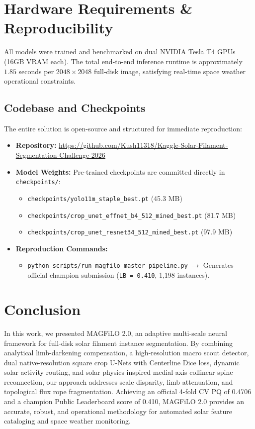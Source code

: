 \documentclass[conference]{IEEEtran}
\begin{document}
\section{Hardware Requirements \& Reproducibility}

All models were trained and benchmarked on dual NVIDIA Tesla T4 GPUs (16GB VRAM each). The total end-to-end inference runtime is approximately $1.85$ seconds per $2048\times2048$ full-disk image, satisfying real-time space weather operational constraints.

\subsection{Codebase and Checkpoints}
The entire solution is open-source and structured for immediate reproduction:
\begin{itemize}
    \item \textbf{Repository:} \url{https://github.com/Kush11318/Kaggle-Solar-Filament-Segmentation-Challenge-2026}
    \item \textbf{Model Weights:} Pre-trained checkpoints are committed directly in \texttt{checkpoints/}:
    \begin{itemize}
        \item \texttt{checkpoints/yolo11m\_staple\_best.pt} (45.3 MB)
        \item \texttt{checkpoints/crop\_unet\_effnet\_b4\_512\_mined\_best.pt} (81.7 MB)
        \item \texttt{checkpoints/crop\_unet\_resnet34\_512\_mined\_best.pt} (97.9 MB)
    \end{itemize}
    \item \textbf{Reproduction Commands:}
    \begin{itemize}
        \item \texttt{python scripts/run\_magfilo\_master\_pipeline.py} $\longrightarrow$ Generates official champion submission (\texttt{LB = 0.410}, 1,198 instances).
    \end{itemize}
\end{itemize}

\section{Conclusion}
In this work, we presented MAGFiLO 2.0, an adaptive multi-scale neural framework for full-disk solar filament instance segmentation. By combining analytical limb-darkening compensation, a high-resolution macro scout detector, dual native-resolution square crop U-Nets with Centerline Dice loss, dynamic solar activity routing, and solar physics-inspired medial-axis collinear spine reconnection, our approach addresses scale disparity, limb attenuation, and topological flux rope fragmentation. Achieving an official 4-fold CV PQ of 0.4706 and a champion Public Leaderboard score of 0.410, MAGFiLO 2.0 provides an accurate, robust, and operational methodology for automated solar feature cataloging and space weather monitoring.
\end{document}
